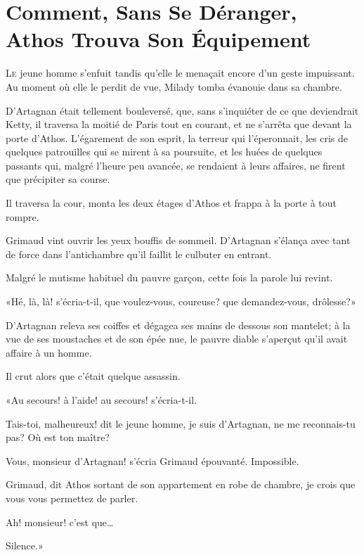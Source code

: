 
\chapter[Comment Athos Trouva Son Équipement]{Comment, Sans Se Déranger, Athos Trouva Son Équipement}

\lettrine{L}{e} jeune homme s'enfuit tandis qu'elle le menaçait encore d'un geste impuissant. Au moment où elle le perdit de vue, Milady tomba évanouie dans sa chambre. 

\zz
D'Artagnan était tellement bouleversé, que, sans s'inquiéter de ce que deviendrait Ketty, il traversa la moitié de Paris tout en courant, et ne s'arrêta que devant la porte d'Athos. L'égarement de son esprit, la terreur qui l'éperonnait, les cris de quelques patrouilles qui se mirent à sa poursuite, et les huées de quelques passants qui, malgré l'heure peu avancée, se rendaient à leurs affaires, ne firent que précipiter sa course. 

Il traversa la cour, monta les deux étages d'Athos et frappa à la porte à tout rompre. 

Grimaud vint ouvrir les yeux bouffis de sommeil. D'Artagnan s'élança avec tant de force dans l'antichambre qu'il faillit le culbuter en entrant. 

Malgré le mutisme habituel du pauvre garçon, cette fois la parole lui revint. 

«Hé, là, là! s'écria-t-il, que voulez-vous, coureuse? que demandez-vous, drôlesse?» 

D'Artagnan releva ses coiffes et dégagea ses mains de dessous son mantelet; à la vue de ses moustaches et de son épée nue, le pauvre diable s'aperçut qu'il avait affaire à un homme. 

Il crut alors que c'était quelque assassin. 

«Au secours! à l'aide! au secours! s'écria-t-il. 

\speak  Tais-toi, malheureux! dit le jeune homme, je suis d'Artagnan, ne me reconnais-tu pas? Où est ton maître? 

\speak  Vous, monsieur d'Artagnan! s'écria Grimaud épouvanté. Impossible. 

\speak  Grimaud, dit Athos sortant de son appartement en robe de chambre, je crois que vous vous permettez de parler. 

\speak  Ah! monsieur! c'est que\dots 

\speak  Silence.» 

